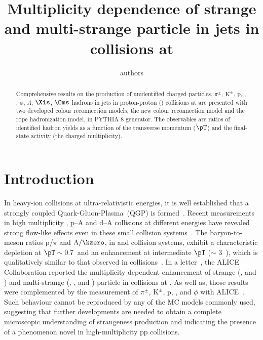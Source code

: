 \documentclass[ALICE,manyauthors]{StrinJet}
\begin{document}
\title{Multiplicity dependence of strange and multi-strange particle in jets in \pp collisions at \seven}
\author{authors}
\begin{abstract}
	\label{sec:Abs}
Comprehensive results on the production of unidentified charged particles, $\pi^{\pm}$, $\mathrm{K^{\pm}}$, p, \kzero, \kstar, $\phi$, $\Lambda$, $\Xis$, $\Oms$ hadrons in jets in proton-proton (\pp) collisions at \seven  are presented
with two developed colour reconnection models, the new colour reconnection model and the rope hadronization model, in PYTHIA 8 generator. The observables are ratios of identified hadron yields as a function of the transverse momentum ($\pT$) and the final-state activity (the charged multiplicity).


\end{abstract}


\setcounter{page}{1}


\section{Introduction}
\label{sec:intro}
In heavy-ion collisions at ultra-relativistic energies, it is well established that a strongly coupled Quark-Gluon-Plasma~(QGP) is formed~\cite{Adams:2005dq, Adcox:2004mh, Arsene:2004fa, Back:2004je, Schukraft:2011na}.
Recent measurements in high multiplicity \pp, p--A and d--A collisions at different energies have revealed strong flow-like effects even in these small collision systems~\cite{Abelev:2012sk, Chatrchyan:2013eya, Khachatryan:2010gv, CMS:2012qk, Abelev:2012ola, Aad:2012gla, Aad:2013fja, Chatrchyan:2013nka, Adare:2013esx, Adams:2006nd}.
The baryon-to-meson ratios p/$\pi$ and $\Lambda/\kzero$, in \pp and \pPb collision systems, exhibit a characteristic depletion at $\pT \sim 0.7$~\GeVc and an enhancement at intermediate $\pT$ ($\sim$ 3~\GeVc), which is qualitatively similar to that observed in \PbPb collisions~\cite{ALICE:2018pal}.
In a letter~\cite{ALICE:2016fzo}, the ALICE Collaboration reported the multiplicity dependent enhancement of strange (\kzero, \lmb and \almb) and multi-strange (\X, \Ix, \Om and \Mo) particle in \pp collisions at \seven. As well as, those results were complemented by the measurement of $\pi^{\pm}$, $\mathrm{K}^{\pm}$, p, \pbar, \kstar and $\phi$ with ALICE~\cite{ALICE:2018pal}.
Such behaviour cannot be reproduced by any of the MC models commonly used, suggesting that further developments are needed to obtain a complete microscopic understanding of strangeness production and indicating the presence of a phenomenon novel in high-multiplicity pp collisions.
\end{document}
